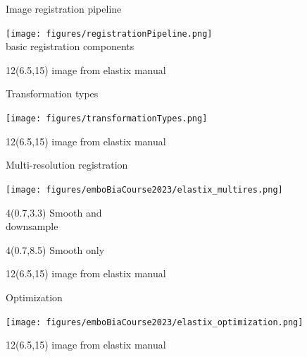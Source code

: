 \documentclass[aspectratio=169]{beamer}
\newcommand\citefoot[1]{
    \begin{textblock}{12}(6.5,15)
        {\color{HHMIGrayB} \tiny #1}
    \end{textblock}
}
\begin{document}
\begin{frame}{Image registration pipeline}

    \vspace{0.8em}
    \begin{center}
        \texttt{[image: figures/registrationPipeline.png]} \\
        basic registration components
    \end{center}

    \citefoot{image from elastix manual}
\end{frame}


\begin{frame}{Transformation types}

    \vspace{1.0em}
    \begin{center}
        \texttt{[image: figures/transformationTypes.png]} \\
    \end{center}

    \citefoot{image from elastix manual}
\end{frame}

\begin{frame}{Multi-resolution registration}

    \vspace{1.0em}
    \begin{center}
        \texttt{[image: figures/emboBiaCourse2023/elastix\_multires.png]} \\
    \end{center}

    \begin{textblock}{4}(0.7,3.3)
        Smooth and \\ downsample
    \end{textblock}

    \begin{textblock}{4}(0.7,8.5)
        Smooth only
    \end{textblock}

    \citefoot{image from elastix manual}
\end{frame}

\begin{frame}{Optimization}

    \vspace{1.0em}
    \begin{center}
        \texttt{[image: figures/emboBiaCourse2023/elastix\_optimization.png]} \\
    \end{center}

    \citefoot{image from elastix manual}
\end{frame}
\end{document}
